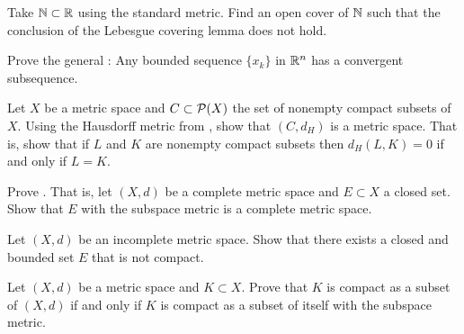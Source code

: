 \begin{exercise}
Take ${\mathbb{N}} \subset {\mathbb{R}}$ using the standard metric.  Find an open cover of ${\mathbb{N}}$
such that the conclusion of the Lebesgue covering lemma does not hold.
\end{exercise}

\begin{exercise}
Prove the general :
Any bounded sequence $\{ x_k
\}$ in ${\mathbb{R}}^n$ has a convergent subsequence.
\end{exercise}

\begin{exercise}
Let $X$ be a metric space and
$C \subset {\mathcal{P}}(X)$ the set of nonempty compact subsets of $X$.
Using the Hausdorff metric from ,
show that $(C,d_H)$ is a metric space.  That is, show that
if $L$ and $K$ are nonempty compact subsets then $d_H(L,K) = 0$
if and only if $L=K$.
\end{exercise}

\begin{exercise} \label{exercise:closedcomplete}
Prove .  That is,
let $(X,d)$ be a complete metric space and $E \subset X$ a closed set.
Show that $E$ with the subspace metric is a complete metric space.
\end{exercise}

\begin{exercise}
Let $(X,d)$ be an incomplete metric space.  Show that there exists a
closed and bounded set $E$ that is not compact.
\end{exercise}

\begin{exercise}
Let $(X,d)$ be a metric space and $K \subset X$.
Prove that $K$ is compact as a subset of $(X,d)$ if and only if $K$ is
compact as a subset of itself with the subspace metric.
\end{exercise}

